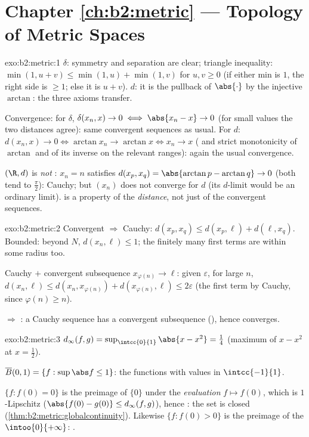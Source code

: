 \section*{Chapter \ref{ch:b2:metric} --- Topology of Metric Spaces}

\begin{solution}{exo:b2:metric:1}
$\delta$: symmetry and separation are clear; triangle inequality:
$\min(1, u + v) \leq \min(1,u) + \min(1,v)$ for $u, v \geq 0$ (if
either min is $1$, the right side is $\geq 1$; else it is $u + v$).
$d$: it is the pullback of $\abs{\cdot}$ by the injective $\arctan$:
the three axioms transfer.

Convergence: for $\delta$, $\delta(x_n, x) \to 0 \iff \abs{x_n - x}
\to 0$ (for small values the two distances agree): same convergent
sequences as usual. For $d$: $d(x_n, x) \to 0 \iff \arctan x_n \to
\arctan x \iff x_n \to x$ ( and strict monotonicity of
$\arctan$ and of its inverse on the relevant ranges): again the
usual convergence.

$(\R, d)$ is \emph{not} : $x_n = n$ satisfies $d(x_p, x_q)
= \abs{\arctan p - \arctan q} \to 0$ (both tend to $\frac\pi2$):
Cauchy; but $(x_n)$ does not converge for $d$ (its $d$-limit would
be an ordinary limit).  is a property of the
\emph{distance}, not just of the convergent sequences.
\end{solution}

\begin{solution}{exo:b2:metric:2}
Convergent $\Rightarrow$ Cauchy: $d(x_p, x_q) \leq d(x_p, \ell) +
d(\ell, x_q)$. Bounded: beyond $N$, $d(x_n, \ell) \leq 1$; the
finitely many first terms are within some radius too.

Cauchy $+$ convergent subsequence $x_{\varphi(n)} \to \ell$: given
$\varepsilon$, for large $n$, $d(x_n, \ell) \leq d(x_n,
x_{\varphi(n)}) + d(x_{\varphi(n)}, \ell) \leq 2\varepsilon$ (the
first term by Cauchy, since $\varphi(n) \geq n$).

 $\Rightarrow$ : a Cauchy sequence has a convergent
subsequence (), hence converges.
\end{solution}

\begin{solution}{exo:b2:metric:3}
$d_\infty(f, g) = \sup_{\intcc{0}{1}} \abs{x - x^2} = \frac14$
(maximum of $x - x^2$ at $x = \frac12$).

$\overline B(0, 1) = \{f : \sup\abs f \leq 1\}$: the 
functions with values in $\intcc{-1}{1}$.

$\{f : f(0) = 0\}$ is the preimage of $\{0\}$ under the
\emph{evaluation} $f \mapsto f(0)$, which is $1$-Lipschitz
($\abs{f(0) - g(0)} \leq d_\infty(f,g)$), hence : the set
is closed (\cref{thm:b2:metric:globalcontinuity}). Likewise $\{f :
f(0) > 0\}$ is the preimage of the  $\intoo{0}{+\infty}$: .
\end{solution}


